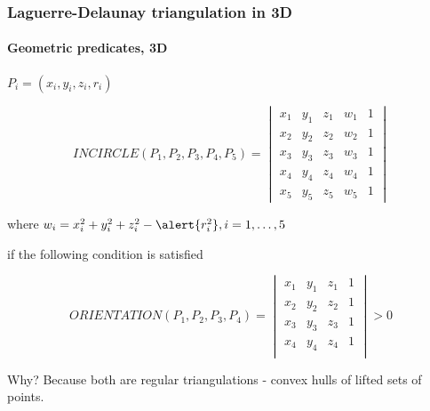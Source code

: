 \documentclass[c, 10pt]{beamer}
\begin{document}
\begin{frame}\frametitle{Laguerre-Delaunay triangulation in 3D}\framesubtitle{Geometric predicates, 3D}
$P_i = (x_i, y_i, z_i, r_i)$

$$INCIRCLE(P_1,P_2,P_3,P_4, P_5) = \begin{vmatrix} x_1 & y_1 & z_1 & w_1 & 1 \\
x_2 & y_2 & z_2 & w_2 & 1 \\
x_3 & y_3 & z_3 & w_3 & 1 \\
x_4 & y_4 & z_4 & w_4 & 1 \\
x_5 & y_5 & z_5 & w_5 & 1\end{vmatrix}$$

where $w_i = x_i^2  + y_i^2 + z_i^2 - \alert{r_i^2}, i = 1,\dots, 5$

if the following condition is satisfied

$$ORIENTATION(P_1,P_2,P_3,P_4) = 
\begin{vmatrix} 
x_1 & y_1 & z_1 & 1 \\
x_2 & y_2 & z_2 & 1 \\
x_3 & y_3 & z_3 & 1 \\
x_4 & y_4 & z_4 & 1 \\
\end{vmatrix} > 0$$

Why? Because both are \alert{regular triangulations} - convex hulls of lifted sets of points.

\end{frame}
\end{document}
